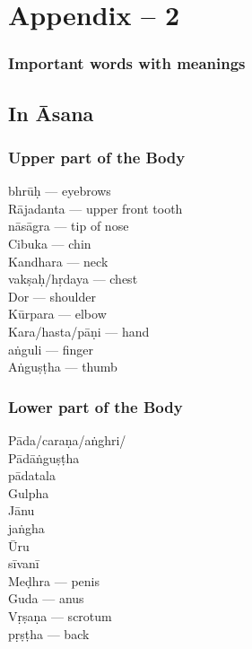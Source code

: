\chapter{Appendix – 2}

\subsection*{Important words with meanings}

\section*{In Āsana}

\subsection*{Upper part of the Body}

\begin{multicols}{2}
bhrūḥ --- eyebrows\\
Rājadanta --- upper front tooth\\
nāsāgra --- tip of nose\\
Cibuka --- chin\\
Kandhara --- neck \\
vakṣaḥ/hṛdaya --- chest \\
Dor --- shoulder\\
Kūrpara --- elbow\\ 
Kara/hasta/pāṇi --- hand\\
aṅguli --- finger\\
Aṅguṣṭha --- thumb
\end{multicols}

\subsection*{Lower part of the Body}

\begin{multicols}{2}
Pāda/caraṇa/aṅghri/ \\
Pādāṅguṣṭha \\
pādatala \\
Gulpha \\
Jānu \\
jaṅgha \\
Ūru \\
sīvanī \\
Meḍhra --- penis\\
Guda --- anus  \\
Vṛṣaṇa --- scrotum\\
pṛṣṭha --- back
\end{multicols}

